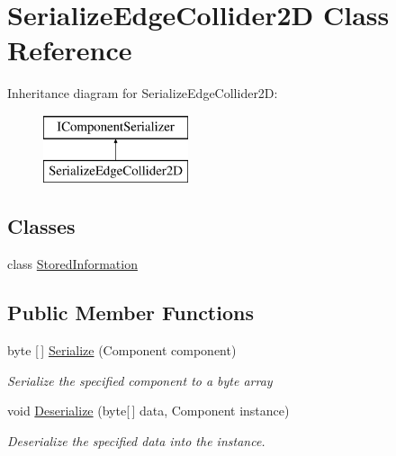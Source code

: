 \hypertarget{class_serialize_edge_collider2_d}{}\section{Serialize\+Edge\+Collider2D Class Reference}
\label{class_serialize_edge_collider2_d}
Inheritance diagram for Serialize\+Edge\+Collider2D\+:\begin{figure}[H]
\begin{center}
\leavevmode
\includegraphics[height=2.000000cm]{class_serialize_edge_collider2_d}
\end{center}
\end{figure}
\subsection*{Classes}
\begin{DoxyCompactItemize}
\item 
class \hyperlink{class_serialize_edge_collider2_d_1_1_stored_information}{Stored\+Information}
\end{DoxyCompactItemize}
\subsection*{Public Member Functions}
\begin{DoxyCompactItemize}
\item 
byte \mbox{[}$\,$\mbox{]} \hyperlink{class_serialize_edge_collider2_d_aa0efa9c04d2981e21c8d7a66003b1cf9}{Serialize} (Component component)
\begin{DoxyCompactList}\small\item\em Serialize the specified component to a byte array \end{DoxyCompactList}\item 
void \hyperlink{class_serialize_edge_collider2_d_a6abc37b6168840eaea4bf0bdbdc4c624}{Deserialize} (byte\mbox{[}$\,$\mbox{]} data, Component instance)
\begin{DoxyCompactList}\small\item\em Deserialize the specified data into the instance. \end{DoxyCompactList}\end{DoxyCompactItemize}


